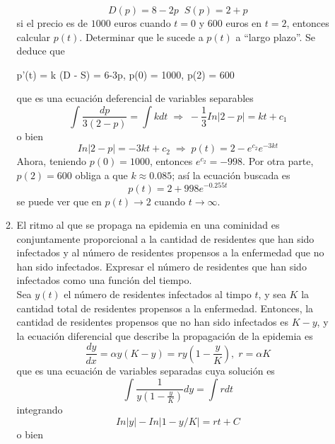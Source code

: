 \documentclass[10pt,a4paper,notitlepage]{report}
\begin{document}
\begin{itemize}
\begin{enumerate}
\begin{equation}
D(p) = 8 - 2p \; \; S(p) = 2 + p
\end{equation}
si el precio es de $1000$ euros cuando $t= 0$ y $600$ euros en $t = 2$, entonces calcular $p(t)$. Determinar que le sucede a $p(t)$ a ``largo plazo''.
\large
Se deduce que
\begin{enumerate}
p'(t) = k (D - S) = 6-3p, \; p(0) = 1000, \; p(2) = 600
\end{enumerate}
que es una ecuación deferencial de variables separables
\begin{equation}
\int \frac{dp}{3(2 - p)} = \int k dt
 \; \Rightarrow \; - \frac{1}{3} In |2 - p| = kt + c_{1}
 \end{equation}
 o bien
 \begin{equation}
In |2 - p| = -3kt + c_{2} \; \Rightarrow \; p(t) = 2 - e^{c_{2}} e^{-3kt}
 \end{equation}
 Ahora, teniendo $p(0) = 1000$, entonces $e^{c_{2}} = -998.$ Por otra parte, $p(2) = 600$ obliga a que $k \approx 0.085$; así la ecuación buscada es
 \begin{equation}
 p(t) = 2 + 998 e^{-0.255 t}
 \end{equation}
 se puede ver que en $p(t) \rightarrow 2$ cuando $t \rightarrow \infty$.
 \Large
 \item El ritmo al que se propaga na epidemia en una cominidad es conjuntamente proporcional a la cantidad de residentes que han sido infectados y al número de residentes propensos a la enfermedad que no han sido infectados. Expresar el número de residentes que han sido infectados como una función del tiempo. \\
 \large
 Sea $y(t)$ el número de residentes infectados al timpo $t$, y sea $K$ la cantidad total de residentes propensos a la enfermedad. Entonces, la cantidad de residentes propensos que no han sido infectados es $K - y$, y la ecuación diferencial que describe la propagación de la epidemia es
 \begin{equation}
\frac{dy}{dx} = \alpha y (K - y) = ry (1 - \frac{y}{K}), \; r = \alpha K 
 \end{equation}
 que es una ecuación de variables separadas cuya solución es
 \begin{equation}
\int \frac{1}{y (1 - \frac{y}{K})} dy = \int rdt
 \end{equation}
 integrando
 \begin{equation}
In |y| - In |1- y/K| = rt + C
 \end{equation}
 o bien
\begin{equation}

\end{equation}
\end{enumerate}
\end{itemize}
\end{document}
